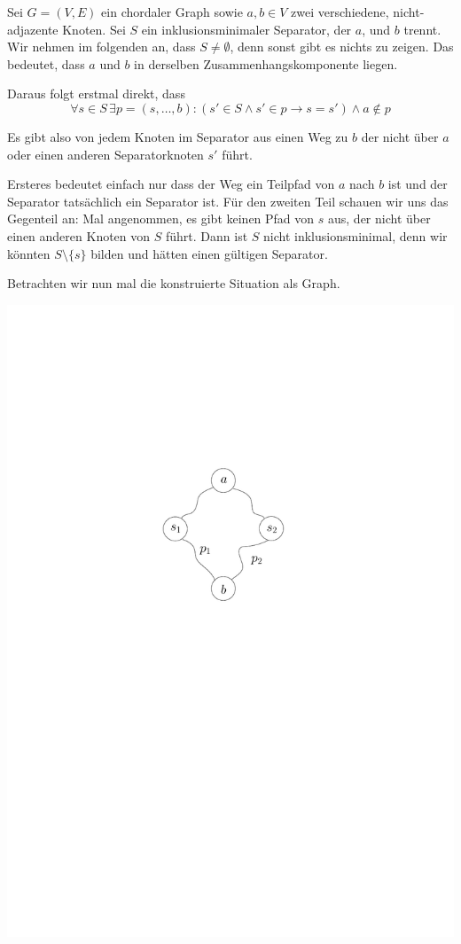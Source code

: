 
\subexercise
\label{sec:sep-clique}

Sei $G = (V,E)$ ein chordaler Graph sowie $a,b \in V$ zwei verschiedene, nicht-adjazente Knoten. Sei $S$ ein inklusionsminimaler Separator, der $a$, und $b$ trennt.
Wir nehmen im folgenden an, dass $S \neq \emptyset$, denn sonst gibt es nichts zu zeigen. Das bedeutet, dass $a$ und $b$ in derselben Zusammenhangskomponente liegen.

Daraus folgt erstmal direkt, dass $$\forall s \in S \, \exists p = (s, \dots, b) \colon (s' \in S \wedge s' \in p \rightarrow s = s') \wedge a \notin p$$

Es gibt also von jedem Knoten im Separator aus einen Weg zu $b$ der nicht über $a$ oder einen anderen Separatorknoten $s'$ führt.

Ersteres bedeutet einfach nur dass der Weg ein Teilpfad von $a$ nach $b$ ist und der Separator tatsächlich ein Separator ist. Für den zweiten Teil schauen wir uns das Gegenteil an:
Mal angenommen, es gibt keinen Pfad von $s$ aus, der nicht über einen anderen Knoten von $S$ führt. Dann ist $S$ nicht inklusionsminimal, denn wir könnten $S \setminus \{s\}$ bilden und hätten einen gültigen Separator.

Betrachten wir nun mal die konstruierte Situation als Graph.

\begin{center}
    \vspace{1ex}
    \includegraphics[page=1]{fig/03-2a-pfade}
\end{center}

